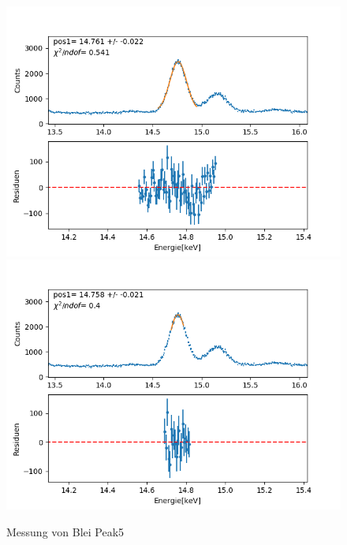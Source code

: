 \documentclass[12pt,a4paper]{article}
\begin{document}
\begin{figure}[H]
\centering
\includegraphics[scale=0.49]{Bilder/roentgen_spektren/blei/pb5_1.png}
\includegraphics[scale=0.49]{Bilder/roentgen_spektren/blei/pb5_2.png}
\caption{Messung von Blei Peak5}
\end{figure}
\end{document}
